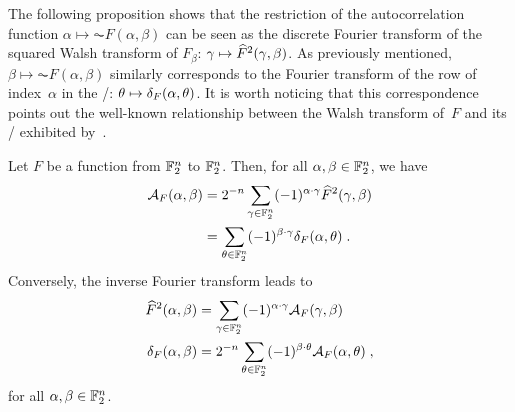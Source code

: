 The following proposition shows that the restriction of the autocorrelation function $\alpha \mapsto \AC{F}(\alpha,\beta)$ can be seen as the discrete Fourier transform of the squared Walsh transform of $F_\beta$: $\gamma \mapsto \widehat{F}^2(\gamma,\beta)$.
As previously mentioned, $\beta \mapsto \AC{F}(\alpha,\beta)$ similarly corresponds to the Fourier transform of the row of index~$\alpha$ in the \DDT/: $\theta \mapsto \delta_{F}(\alpha,\theta)$.
It is worth noticing that this correspondence points out the well-known relationship between the Walsh transform of~$F$ and its \DDT/ exhibited by~\textcite{EC:ChaVau94,EC:BloNyb13}.

\begin{proposition}
  Let $F$ be a function from $\mathbb{F}_2^n$ to $\mathbb{F}_2^n$.
  Then, for all $\alpha,\beta \in \mathbb{F}_2^n$, we have
  \begin{align}
      \mathcal{A}_{F}(\alpha,\beta) &= 2^{-n} \sum_{\gamma \in \mathbb{F}_2^n} (-1)^{\alpha \cdot \gamma} \widehat{F}^2(\gamma,\beta) \label{eq1}\\
               &= \sum_{\theta \in \mathbb{F}_2^n} (-1)^{\beta \cdot \gamma} \delta_{F}(\alpha,\theta) \label{eq2}\;.
  \end{align}
  Conversely, the inverse Fourier transform leads to
  \begin{align}
       \widehat{F}^2(\alpha,\beta) &= \sum_{\gamma \in \mathbb{F}_2^n} (-1)^{\alpha \cdot \gamma} \mathcal{A}_{F}(\gamma,\beta) \label{eq3}\\
       \delta_{F}(\alpha,\beta) &= 2^{-n} \sum_{\theta \in \mathbb{F}_2^n} (-1)^{\beta \cdot \theta} \mathcal{A}_{F}(\alpha,\theta) \label{eq4}\;,
  \end{align}
  for all $\alpha,\beta \in \mathbb{F}_2^n$.
\end{proposition}
